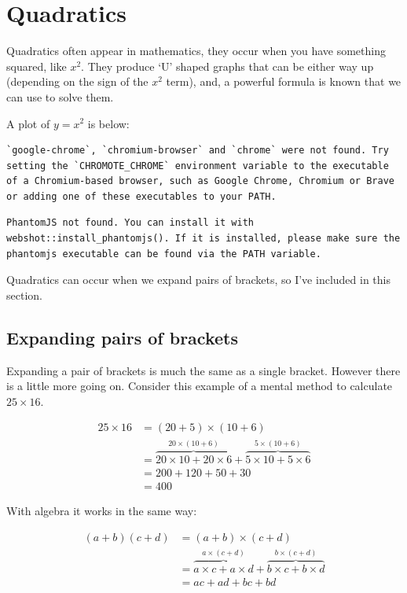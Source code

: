 \documentclass[
  a4paper,
]{scrbook}
\begin{document}
\chapter{Quadratics}\label{quadratics}

Quadratics often appear in mathematics, they occur when you have
something squared, like \(x^2\). They produce `U' shaped graphs that can
be either way up (depending on the sign of the \(x^2\) term), and, a
powerful formula is known that we can use to solve them.

A plot of \(y=x^2\) is below:

\begin{verbatim}
`google-chrome`, `chromium-browser` and `chrome` were not found. Try setting the `CHROMOTE_CHROME` environment variable to the executable of a Chromium-based browser, such as Google Chrome, Chromium or Brave or adding one of these executables to your PATH.
\end{verbatim}

\begin{verbatim}
PhantomJS not found. You can install it with webshot::install_phantomjs(). If it is installed, please make sure the phantomjs executable can be found via the PATH variable.
\end{verbatim}

Quadratics can occur when we expand pairs of brackets, so I've included
in this section.

\section{Expanding pairs of
brackets}\label{expanding-pairs-of-brackets-1}

Expanding a pair of brackets is much the same as a single bracket.
However there is a little more going on. Consider this example of a
mental method to calculate \(25 \times 16\).

\[
\begin{aligned} 25 \times 16 &= (20 + 5) \times (10 + 6) \\
&= \overbrace{20 \times 10 + 20 \times 6}^{20 \times (10 + 6)} + \overbrace{5 \times 10 + 5 \times 6}^{5 \times (10 + 6)}\\
&= 200 + 120 + 50 + 30 \\
&= 400
\end{aligned}
\]

With algebra it works in the same way:

\[
\begin{aligned} (a+b)(c+d) &= (a+b) \times (c+d) \\
&= \overbrace{a \times c + a \times d}^{a \times (c+d)} + \overbrace{b \times c + b \times d}^{b \times (c+d)}\\
&= ac + ad + bc + bd
\end{aligned}
\]
\end{document}
